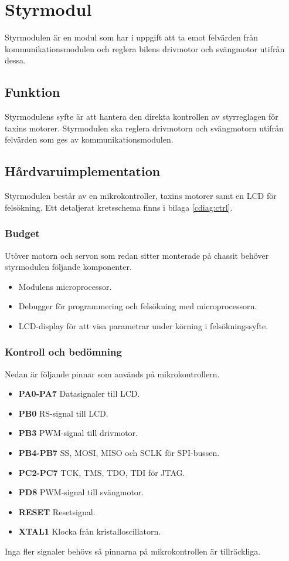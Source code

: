 \documentclass[designspec/spec.tex]{subfiles}
\begin{document}
\section{Styrmodul}
Styrmodulen är en modul som har i uppgift att ta emot felvärden från
kommunikationsmodulen och reglera bilens drivmotor och svängmotor utifrån
dessa.

\subsection{Funktion}
Styrmodulens syfte är att hantera den direkta kontrollen av styrreglagen för
taxins motorer. Styrmodulen ska reglera drivmotorn och svängmotorn utifrån
felvärden som ges av kommunikationsmodulen.

\subsection{Hårdvaruimplementation}
Styrmodulen består av en mikrokontroller, taxins motorer samt en LCD för
felsökning. Ett detaljerat kretsschema finns i bilaga \ref{cdiag:ctrl}.

\subsubsection{Budget}
Utöver motorn och servon som redan sitter monterade på chassit behöver
styrmodulen följande komponenter.
\begin{itemize}
	\item \textbf{\modMicrocontroller} Modulens microprocessor. 
    \item \textbf{\modJtag} Debugger för programmering och felsökning med
        microprocessorn. 
    \item \textbf{\modLcd} LCD-display för att visa parametrar under körning i
        felsökningssyfte.
\end{itemize}

\subsubsection{Kontroll och bedömning}
Nedan är följande pinnar som används på mikrokontrollern.
\begin{itemize}
   \item \textbf{PA0-PA7} Datasignaler till LCD.
   \item \textbf{PB0} RS-signal till LCD.
   \item \textbf{PB3} PWM-signal till drivmotor.
   \item \textbf{PB4-PB7} SS, MOSI, MISO och SCLK för SPI-bussen.
   \item \textbf{PC2-PC7} TCK, TMS, TDO, TDI för JTAG.
   \item \textbf{PD8} PWM-signal till svängmotor.
   \item \textbf{RESET} Resetsignal.
   \item \textbf{XTAL1} Klocka från kristalloscillatorn.
\end{itemize}
Inga fler signaler behövs så pinnarna på mikrokontrollen är tillräckliga.
\end{document}
